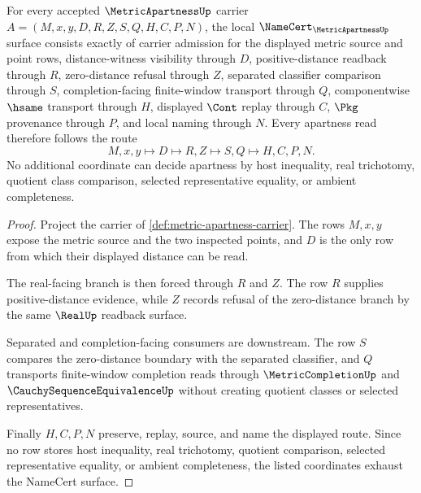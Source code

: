 \begin{theorem}
\label{thm:metric-apartness-namecert-obligations}
For every accepted $\MetricApartnessUp$ carrier $A=(M,x,y,D,R,Z,S,Q,H,C,P,N)$, the local $\NameCert_{\MetricApartnessUp}$ surface consists exactly of carrier admission for the displayed metric source and point rows, distance-witness visibility through $D$, positive-distance readback through $R$, zero-distance refusal through $Z$, separated classifier comparison through $S$, completion-facing finite-window transport through $Q$, componentwise $\hsame$ transport through $H$, displayed $\Cont$ replay through $C$, $\Pkg$ provenance through $P$, and local naming through $N$. Every apartness read therefore follows the route
$$
M,x,y\longmapsto D\longmapsto R,Z\longmapsto S,Q\longmapsto H,C,P,N .
$$
No additional coordinate can decide apartness by host inequality, real trichotomy, quotient class comparison, selected representative equality, or ambient completeness.
\end{theorem}
\begin{proof}
Project the carrier of \autoref{def:metric-apartness-carrier}. The rows $M,x,y$ expose the metric source and the two inspected points, and $D$ is the only row from which their displayed distance can be read.

The real-facing branch is then forced through $R$ and $Z$. The row $R$ supplies positive-distance evidence, while $Z$ records refusal of the zero-distance branch by the same $\RealUp$ readback surface.

Separated and completion-facing consumers are downstream. The row $S$ compares the zero-distance boundary with the separated classifier, and $Q$ transports finite-window completion reads through $\MetricCompletionUp$ and $\CauchySequenceEquivalenceUp$ without creating quotient classes or selected representatives.

Finally $H,C,P,N$ preserve, replay, source, and name the displayed route. Since no row stores host inequality, real trichotomy, quotient comparison, selected representative equality, or ambient completeness, the listed coordinates exhaust the NameCert surface.
\end{proof}

